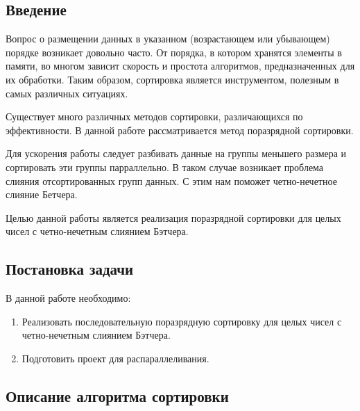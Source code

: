 \documentclass{report}
\begin{document}
\setcounter{page}{2}

\tableofcontents

\newpage
\begin{center}
\section*{Введение}
\end{center}

Вопрос о размещении данных в указанном (возрастающем или убывающем) порядке возникает довольно часто. От порядка, в котором хранятся элементы в памяти, во многом зависит скорость и простота алгоритмов, предназначенных для их обработки. Таким образом, сортировка является инструментом, полезным в самых различных ситуациях.
\par Существует много различных методов сортировки, различающихся по эффективности. В данной работе рассматривается метод поразрядной сортировки.
\par Для ускорения работы следует разбивать данные на группы меньшего размера и сортировать эти группы парраллельно. В таком случае возникает проблема слияния отсортированных групп данных. С этим нам поможет четно-нечетное слияние Бетчера.
\par Целью данной работы является реализация поразрядной сортировки для целых чисел с четно-нечетным слиянием Бэтчера. 

\newpage
\begin{center}
\section*{Постановка задачи}
\end{center}

В данной работе необходимо:
\begin{enumerate}
\item Реализовать последовательную поразрядную сортировку для целых чисел с четно-нечетным слиянием Бэтчера.
\item Подготовить проект для распараллеливания.
\end{enumerate}

\newpage
\begin{center}
\section*{Описание алгоритма сортировки}
\end{center}
\end{document}
